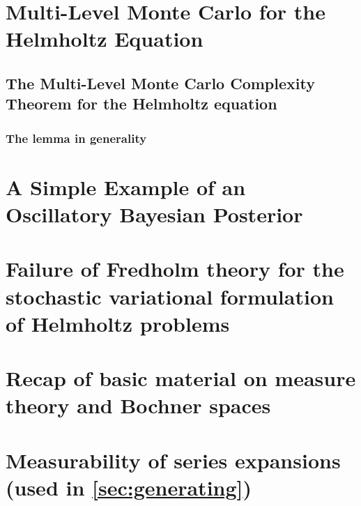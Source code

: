 \documentclass{report}
\begin{document}
\chapter{Multi-Level Monte Carlo for the Helmholtz Equation}\label{chap:mlmc}

\section{The Multi-Level Monte Carlo Complexity Theorem for the Helmholtz equation}\label{sec:comp}



\subsection{The lemma in generality}



\appendix

\chapter{A Simple Example of an Oscillatory Bayesian Posterior}\label{app:osc}


\chapter{Failure of Fredholm theory for the stochastic variational formulation of Helmholtz problems}\label{sec:federico}
 	

\chapter{Recap of basic material on measure theory and Bochner spaces}\label{app:mtBs}


\chapter{Measurability of series expansions (used in \cref{sec:generating})}\label{app:meas}




\end{document}
